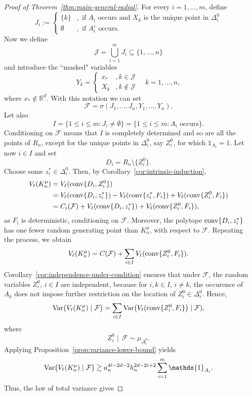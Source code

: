 \documentclass[10pt]{amsart}
\newcommand{\1}{\textbf{1}}
\newcommand{\conv}{{\rm conv}}
\newcommand{\Var}{{\rm Var}}
\numberwithin{equation}{section} %
\theoremstyle{remark}
\theoremstyle{definition}
\begin{document}
\begin{proof}[Proof of Theorem~\ref{thm:main-general-radial}]
For every $i=1,\ldots,m$, define \[J_i:=\begin{cases}
    \{k\} &, \text{ if } A_i \text{ occurs and }  X_k \text{ is the unique point in } \Delta_i^0\\
    \emptyset &, \text{ if } A_i^c \text{ occurs}. 
\end{cases}
\] Now we define \[\mathcal{J}=\bigcup_{i=1}^{m} J_i \subseteq \{1,\ldots,n\} \] and introduce the ``masked" variables \[
Y_k=\begin{cases}
x_\ast &, k \in \mathcal{J}\\
X_k &, k \notin \mathcal{J}
\end{cases}
\quad k=1,\ldots,n,\] where $x_\ast \notin \mathbb{R}^d$. With this notation we can set \[\mathcal{F}=\sigma(J_1,\ldots,J_n,Y_1,\ldots,Y_n).\] Let also \[I = \{1 \leq i \leq m: J_i \neq \emptyset\}=\{1 \leq i \leq m: A_i \text{ occurs}\}.\] Conditioning on $\mathcal{F}$ means that $I$ is completely determined and so are all the points of $R_n$, except for the unique points in $\Delta_i^0$, say $Z_i^0$, for which $\mathds{1}_{A_i}=1$. Let now $i \in I$ and set \[D_i=R_n \setminus\{Z_i^0\}.\] Choose some $z_i^\ast \in \Delta_i^0$. Then, by Corollary~\ref{cor:intrinsic-induction},
\begin{align*}
V_\ell(K_n^\mu)&=V_\ell(\conv\{D_i,Z_i^0\})\\
&=V_\ell(\conv\{D_i,z_i^\ast\})-V_\ell(\conv\{z_i^\ast,F_i\})+V_\ell(\conv\{Z_i^0,F_i\})\\
&=C_i(\mathcal{F})+V_\ell(\conv\{D_i,z_i^\ast\})+V_\ell(\conv\{Z_i^0,F_i\}),
\end{align*} as $F_i$ is deterministic, conditioning on $\mathcal{F}$. Moreover, the polytope  $\conv\{D_i,z_i^\ast\}$ has one fewer random generating point than $K_n^\mu$, with respect to $\mathcal{F}$. Repeating the process, we obtain \[V_\ell(K_n^\mu)=C(\mathcal{F})+\sum_{i \in I} V_\ell(\conv\{Z_i^0,F_i\}). \] Corollary~\ref{cor:independence-under-condition} ensures that under $\mathcal{F}$, the random variables $Z_i^0, \, i \in I$ are independent, because for $i,k \in I, \, i \neq k$, the occurence of $A_k$ does not impose further restriction on the location of $Z_i^0 \in \Delta_i^0$. Hence, \[\Var\bigl(V_\ell(K_n^\mu)\mid \mathcal{F}\bigr)=\sum_{i \in I} \Var\bigl(V_\ell(\conv\{Z_i^0,F_i\}\bigr)\mid \mathcal{F}), \] where \[Z_i^0 \mid \,\mathcal{F} \sim \mu_{\Delta_i^0}.\] Applying Proposition~\ref{prop:variance-lower-bound} yields \[\Var\bigl(V_\ell(K_n^\mu)\mid \mathcal{F}\bigr) \gtrsim a_n^{4\ell-2d-2}h_n^{2d-2\ell+2} \sum_{i=1}^m\mathds{1}_{A_i}.\] Thus, the law of total variance gives

\end{proof}
\end{document}
